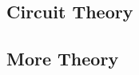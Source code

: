 \blindtext[2]

\subsection{Circuit Theory}

\blindtext[2]



\blindtext[1]

\subsection{More Theory}

\blindtext[1]
\cite{lamport1994latex}
\blindtext[1]